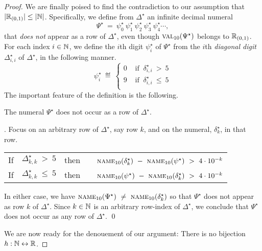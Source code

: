 \begin{proof}
We are finally poised to find the contradiction to our assumption that $|\mathbb{R}_{(0,1)}| \leq |\mathbb{N}|$.  Specifically, we define from $\Delta^\star$ an infinite decimal numeral
\[ \Psi^\star \ = \ \psi^\star_0 \ \psi^\star_1 \ \psi^\star_2 \ \psi^\star_3 \ \psi^\star_4 \cdots, \]
that {\em does not} appear as a row of $\Delta^\star$, even though $\mbox{\sc val}_{10}(\Psi^\star)$ belongs to $\mathbb{R}_{(0,1)}$.  For each index $i \in \mathbb{N}$, we define the $i$th digit $\psi^\star_i$ of $\Psi^\star$ from the $i$th {\em diagonal digit} $\Delta^\star_{i,i}$ of $\Delta^\star$, in the following manner.
\[ \psi^\star_i \ \eqdef \
\left\{
\begin{array}{cc}
0 & \mbox{ if } \ \delta^\star_{i,i} \ > \ 5 \\
9 & \mbox{ if } \ \delta^\star_{i,i} \ \leq \ 5 \\
\end{array}
\right.
\]
The important feature of the definition is the following.

\begin{lemma}
\label{lem:PSI-notin-DELTA-num}
The numeral $\Psi^\star$ does not occur as a row of $\Delta^\star$.
\end{lemma}

.
Focus on an arbitrary row of $\Delta^\star$, say row $k$, and on the numeral, $\delta^\star_k$, in that row.

\medskip

\begin{tabular}{lclc}
If & $\Delta^\star_{k,k} \ > \ 5$ & then & \ \
$\mbox{\sc name}_{10}(\delta^\star_k) \ - \ \mbox{\sc name}_{10}(\psi^\star) \ > \ 4 \cdot 10^{-k}$ \\
If & $\Delta^\star_{k,k} \ \leq \ 5$ & then & \ \
$\mbox{\sc name}_{10}(\psi^\star) \ - \ \mbox{\sc name}_{10}(\delta^\star_k) \ > \ 4
\cdot 10^{-k}$
\end{tabular}

\medskip

\noindent
In either case, we have $\mbox{\sc name}_{10}(\Psi^\star) \ \neq \ \mbox{\sc name}_{10}(\delta^\star_k)$ so that $\Psi^\star$ does not appear as row $k$ of $\Delta^\star$.  Since $k \in \mathbb{N}$ is an arbitrary row-index of $\Delta^\star$, we conclude that $\Psi^\star$ does not occur as any row of $\Delta^\star$.  \qed

\medskip

We are now ready for the denouement of our argument: There is no bijection $h: \mathbb{N} \leftrightarrow \mathbb{R}$.


\end{proof}

